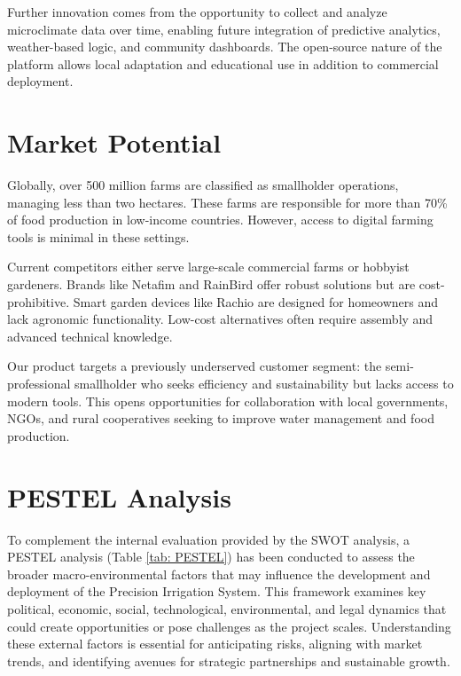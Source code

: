 \documentclass{IEEEtran}
\begin{document}
Further innovation comes from the opportunity to collect and analyze microclimate data over time, enabling future integration of predictive analytics, weather-based logic, and community dashboards. The open-source nature of the platform allows local adaptation and educational use in addition to commercial deployment.

\section{Market Potential}

Globally, over 500 million farms are classified as smallholder operations, managing less than two hectares. These farms are responsible for more than 70\% of food production in low-income countries. However, access to digital farming tools is minimal in these settings.

Current competitors either serve large-scale commercial farms or hobbyist gardeners. Brands like Netafim and RainBird offer robust solutions but are cost-prohibitive. Smart garden devices like Rachio are designed for homeowners and lack agronomic functionality. Low-cost alternatives often require assembly and advanced technical knowledge.

Our product targets a previously underserved customer segment: the semi-professional smallholder who seeks efficiency and sustainability but lacks access to modern tools. This opens opportunities for collaboration with local governments, NGOs, and rural cooperatives seeking to improve water management and food production.

\section{PESTEL Analysis}

To complement the internal evaluation provided by the SWOT analysis, a PESTEL analysis (Table \ref{tab: PESTEL}) has been conducted to assess the broader macro-environmental factors that may influence the development and deployment of the Precision Irrigation System. This framework examines key political, economic, social, technological, environmental, and legal dynamics that could create opportunities or pose challenges as the project scales. Understanding these external factors is essential for anticipating risks, aligning with market trends, and identifying avenues for strategic partnerships and sustainable growth.
\end{document}
